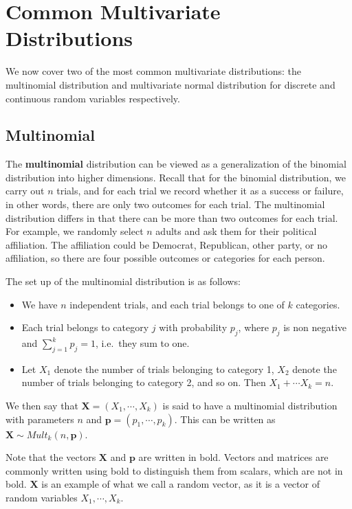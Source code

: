 \documentclass[
]{book}
\providecommand{\tightlist}{%
  \setlength{\itemsep}{0pt}\setlength{\parskip}{0pt}}
\begin{document}
\section{Common Multivariate Distributions}\label{common-multivariate-distributions}

We now cover two of the most common multivariate distributions: the multinomial distribution and multivariate normal distribution for discrete and continuous random variables respectively.

\subsection{Multinomial}\label{multinomial}

The \textbf{multinomial} distribution can be viewed as a generalization of the binomial distribution into higher dimensions. Recall that for the binomial distribution, we carry out \(n\) trials, and for each trial we record whether it as a success or failure, in other words, there are only two outcomes for each trial. The multinomial distribution differs in that there can be more than two outcomes for each trial. For example, we randomly select \(n\) adults and ask them for their political affiliation. The affiliation could be Democrat, Republican, other party, or no affiliation, so there are four possible outcomes or categories for each person.

The set up of the multinomial distribution is as follows:

\begin{itemize}
\tightlist
\item
  We have \(n\) independent trials, and each trial belongs to one of \(k\) categories.
\item
  Each trial belongs to category \(j\) with probability \(p_j\), where \(p_j\) is non negative and \(\sum_{j=1}^k p_j = 1\), i.e.~they sum to one.
\item
  Let \(X_1\) denote the number of trials belonging to category 1, \(X_2\) denote the number of trials belonging to category 2, and so on. Then \(X_1 + \cdots X_k = n\).
\end{itemize}

We then say that \(\boldsymbol{X} = (X_1, \cdots, X_k)\) is said to have a multinomial distribution with parameters \(n\) and \(\boldsymbol{p} = (p_1, \cdots, p_k)\). This can be written as \(\boldsymbol{X} \sim Mult_k(n, \boldsymbol{p})\).

Note that the vectors \(\boldsymbol{X}\) and \(\boldsymbol{p}\) are written in bold. Vectors and matrices are commonly written using bold to distinguish them from scalars, which are not in bold. \(\boldsymbol{X}\) is an example of what we call a random vector, as it is a vector of random variables \(X_1, \cdots, X_k\).
\end{document}
